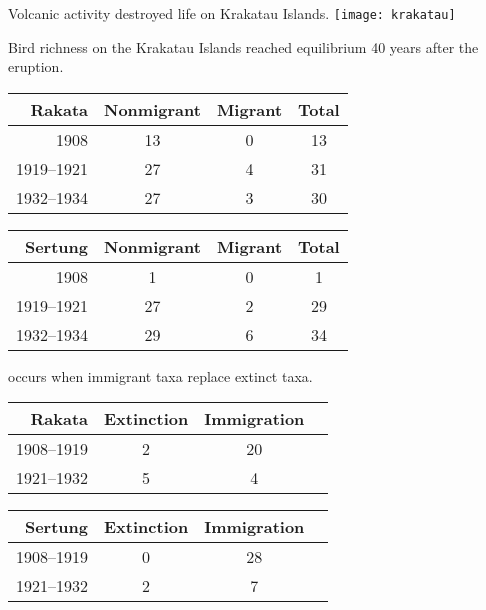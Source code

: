 \documentclass[t]{beamer}
\begin{document}
\begin{frame}{Volcanic activity destroyed life on Krakatau Islands.}
	\centering
		\texttt{[image: krakatau]}
\end{frame}

\begin{frame}{Bird richness on the Krakatau Islands reached equilibrium 40 years after the eruption.}
	\centering
	\begin{tabular}{rccc}
		\toprule
		\textbf{Rakata} & Nonmigrant & Migrant & Total\\
		\midrule
		1908 & 13 & 0 & 13 \\
		1919--1921 & 27 & 4 & 31 \\
		1932--1934 & 27 & 3 & 30 \\
		\bottomrule
	\end{tabular}
	
	\vspace{1\baselineskip}
	
	\begin{tabular}{rccc}
		\toprule
		\textbf{Sertung}& Nonmigrant & Migrant & Total\\
		\midrule
		1908 & 1 & 0 & 1 \\
		1919--1921 & 27 & 2 & 29\\
		1932--1934 & 29 & 6 & 34\\
		\bottomrule
	\end{tabular}
\end{frame}

\begin{frame}{ occurs when immigrant taxa replace extinct taxa.}
	\centering
	\begin{tabular}{rccc}
		\toprule
		\textbf{Rakata} & Extinction & Immigration\\
		\midrule
		1908--1919 & 2 & 20 \\
		1921--1932 & 5 & 4  \\
		\bottomrule
	\end{tabular}

	\vspace{1\baselineskip}

	\begin{tabular}{rccc}
		\toprule
		\textbf{Sertung}& Extinction & Immigration\\
		\midrule
		1908--1919 & 0 & 28 \\
		1921--1932 & 2 & 7  \\
		\bottomrule
	\end{tabular}


		
\end{frame}
\end{document}

